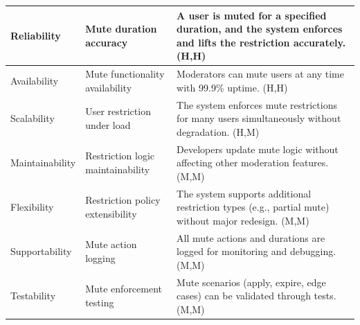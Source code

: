 \documentclass{article}
\begin{document}
\begin{table}[H]
\begin{tabular}{|p{3cm}|p{4cm}|p{7cm}|}
        Reliability
                                   & Mute duration accuracy
                                   & A user is muted for a specified duration, and the system enforces and lifts the restriction accurately. (H,H)                         \\
        \hline

        Availability
                                   & Mute functionality availability
                                   & Moderators can mute users at any time with 99.9\% uptime. (H,H)                                                                       \\
        \hline

        Scalability
                                   & User restriction under load
                                   & The system enforces mute restrictions for many users simultaneously without degradation. (H,M)                                        \\
        \hline

        Maintainability
                                   & Restriction logic maintainability
                                   & Developers update mute logic without affecting other moderation features. (M,M)                                                       \\
        \hline

        Flexibility
                                   & Restriction policy extensibility
                                   & The system supports additional restriction types (e.g., partial mute) without major redesign. (M,M)                                   \\
        \hline

        Supportability
                                   & Mute action logging
                                   & All mute actions and durations are logged for monitoring and debugging. (M,M)                                                         \\
        \hline

        Testability
                                   & Mute enforcement testing
                                   & Mute scenarios (apply, expire, edge cases) can be validated through tests. (M,M)                                                      \\
        \hline
    \end{tabular}
\end{table}
\end{document}
